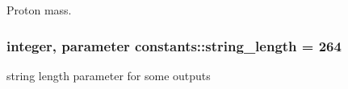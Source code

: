 Proton mass. 

\subsubsection[{\texorpdfstring{string\+\_\+length}{string_length}}]{\setlength{\rightskip}{0pt plus 5cm}integer, parameter constants\+::string\+\_\+length = 264}\hypertarget{namespaceconstants_a6082bfa433cfb27d3f80d0f32b278570}{}\label{namespaceconstants_a6082bfa433cfb27d3f80d0f32b278570}


string length parameter for some outputs 

